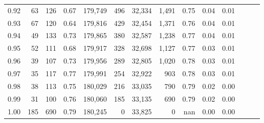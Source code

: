 \begin{tabular}{rrrrrrrrrrrrrr}
0.92 &      63 &  126 &  0.67 &  179,749 &      496 &  32,334 &   1,491 &  0.75 &  0.04 &      0.01 \\
0.93 &      67 &  120 &  0.64 &  179,816 &      429 &  32,454 &   1,371 &  0.76 &  0.04 &      0.01 \\
0.94 &      49 &  133 &  0.73 &  179,865 &      380 &  32,587 &   1,238 &  0.77 &  0.04 &      0.01 \\
0.95 &      52 &  111 &  0.68 &  179,917 &      328 &  32,698 &   1,127 &  0.77 &  0.03 &      0.01 \\
0.96 &      39 &  107 &  0.73 &  179,956 &      289 &  32,805 &   1,020 &  0.78 &  0.03 &      0.01 \\
0.97 &      35 &  117 &  0.77 &  179,991 &      254 &  32,922 &     903 &  0.78 &  0.03 &      0.01 \\
0.98 &      38 &  113 &  0.75 &  180,029 &      216 &  33,035 &     790 &  0.79 &  0.02 &      0.00 \\
0.99 &      31 &  100 &  0.76 &  180,060 &      185 &  33,135 &     690 &  0.79 &  0.02 &      0.00 \\
1.00 &     185 &  690 &  0.79 &  180,245 &        0 &  33,825 &       0 &   nan &  0.00 &      0.00 \\
\bottomrule
\end{tabular}
